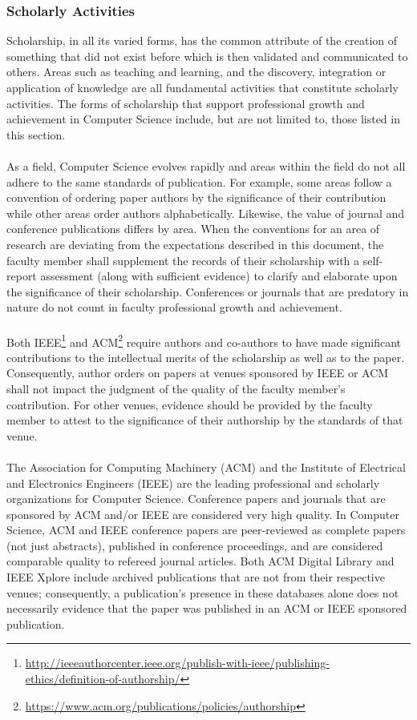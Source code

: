 \documentclass{scrartcl}
\begin{document}
\subsubsection{Scholarly Activities}

Scholarship, in all its varied forms, has the common attribute of the creation of something that did not exist before which is then validated and communicated to others. Areas such as teaching and learning, and the discovery, integration or application of knowledge are all fundamental activities that constitute scholarly activities. The forms of scholarship that support professional growth and achievement in Computer Science include, but are not limited to, those listed in this section.
\\\\
As a field, Computer Science evolves rapidly and areas within the field do not all adhere to the same standards of publication. For example, some areas follow a convention of ordering paper authors by the significance of their contribution while other areas order authors alphabetically. Likewise, the value of journal and conference publications differs by area. When the conventions for an area of research are deviating from the expectations described in this document, the faculty member shall supplement the records of their scholarship with a self-report assessment (along with sufficient evidence) to clarify and elaborate upon the significance of their scholarship.
Conferences or journals that are predatory in nature do not count in faculty professional growth and achievement.
\\\\
Both IEEE\footnote{\href{http://ieeeauthorcenter.ieee.org/publish-with-ieee/publishing-ethics/definition-of-authorship/}{http://ieeeauthorcenter.ieee.org/publish-with-ieee/publishing-ethics/definition-of-authorship/}} and ACM\footnote{\href{https://www.acm.org/publications/policies/authorship}{https://www.acm.org/publications/policies/authorship}} require authors and co-authors to have made significant contributions to the intellectual merits of the scholarship as well as to the paper. Consequently, author orders on papers at venues sponsored by IEEE or ACM shall not impact the judgment of the quality of the faculty member’s contribution. For other venues, evidence should be provided by the faculty member to attest to the significance of their authorship by the standards of that venue.
\\\\
The Association for Computing Machinery (ACM) and the Institute of Electrical and Electronics Engineers (IEEE) are the leading professional and scholarly organizations for Computer Science. Conference papers and journals that are sponsored by ACM and/or IEEE are considered very high quality. In Computer Science, ACM and IEEE conference papers are peer-reviewed as complete papers (not just abstracts), published in conference proceedings, and are considered comparable quality to refereed journal articles. Both ACM Digital Library and IEEE Xplore include archived publications that are not from their respective venues; consequently, a publication’s presence in these databases alone does not necessarily evidence that the paper was published in an ACM or IEEE sponsored publication.
\end{document}
